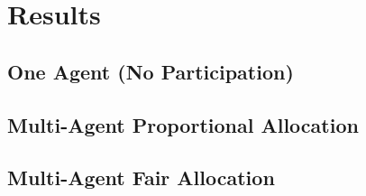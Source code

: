 \chapter{Results}
\label{Results}

\section{One Agent (No Participation)}

\section{Multi-Agent Proportional Allocation}

\section{Multi-Agent Fair Allocation}